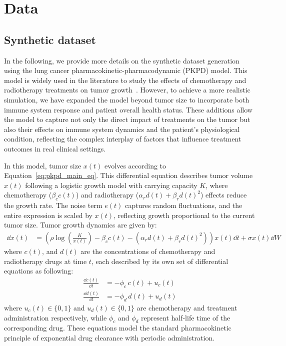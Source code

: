 \documentclass[preprint,12pt]{elsarticle}
\begin{document}
\appendix
\label{appndx}
\section{Data}
\label{appndx:data}
\subsection{Synthetic dataset}
\label{appndx:synthetic_dataset}
In the following, we provide more details on the synthetic dataset generation using the lung cancer pharmacokinetic-pharmacodynamic (PKPD) model. This model is widely used in the literature to study the effects of chemotherapy and radiotherapy treatments on tumor growth~\citep{kacprzyk2024ode}. However, to achieve a more realistic simulation, we have expanded the model beyond tumor size to incorporate both immune system response and patient overall health status. These additions allow the model to capture not only the direct impact of treatments on the tumor but also their effects on immune system dynamics and the patient’s physiological condition, reflecting the complex interplay of factors that influence treatment outcomes in real clinical settings.

In this model, tumor size $x(t)$ evolves according to Equation~\eqref{eq:pkpd_main_eq}. This differential equation describes tumor volume $x(t)$ following a logistic growth model with carrying capacity $K$, where chemotherapy ($\beta_cc(t)$) and radiotherapy ($\alpha_rd(t)+\beta_rd(t)^2$) effects reduce the growth rate. The noise term $e(t)$ captures random fluctuations, and the entire expression is scaled by $x(t)$, reflecting growth proportional to the current tumor size.
Tumor growth dynamics are given by:
\begin{align}
\dd x(t) &= \left( \rho \log \left(\frac{K}{x(t)} \right) - \beta_c c(t) - (\alpha_r d(t) + \beta_r d(t)^2)  \right) x(t) \dd t + \sigma x(t) \dd W
\label{eq:pkpd_main_eq}
\end{align}
where $c(t)$, and $d(t)$ are the concentrations of chemotherapy and radiotherapy drugs at time $t$,  each described by its own set of differential equations as following: 
\begin{align}
\frac{\dd c(t)}{\dd t} &= -\phi_c \, c(t) + u_c(t) 
\label{eq:chemo_eq} \\
\frac{\dd d(t)}{\dd t} &= -\phi_d \, d(t) + u_d(t)
\label{eq:radio_eq}
\end{align}
where $u_c(t) \in \{0,1\}$ and $u_d(t)\in \{0,1\}$ are chemotherapy and treatment administration respectively, while $\phi_c$ and $\phi_d$ represent half-life time of the corresponding drug. These equations model the standard pharmacokinetic principle of exponential drug clearance with periodic administration.
\end{document}
